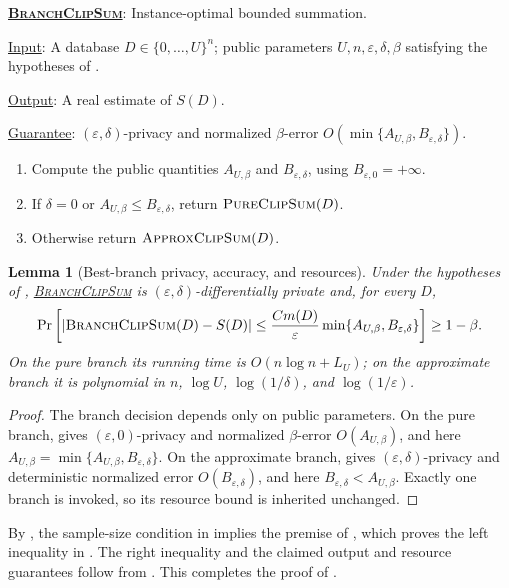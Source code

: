 \documentclass[11pt]{article}
\newenvironment{fminipage}%
  {\begin{Sbox}\begin{minipage}}%
  {\end{minipage}\end{Sbox}\fbox{\TheSbox}}
\newenvironment{algbox}[0]{%
\vskip 0.2in
\noindent
\begin{fminipage}{6.3in}
}{%
\end{fminipage}
\vskip 0.2in
}
\newtheorem{lemma}{Lemma}[section]
\begin{document}
\begin{algbox}
\textbf{\uline{\textsc{BranchClipSum}}}: Instance-optimal bounded
summation.  \label{alg:branch-clip-sum}

\uline{Input}: A database $D\in\{0,\ldots,U\}^n$; public parameters
$U,n,\varepsilon,\delta,\beta$ satisfying the hypotheses of
.

\uline{Output}: A real estimate of $S(D)$.

\uline{Guarantee}: $(\varepsilon,\delta)$-privacy and normalized
$\beta$-error $O(\min\{A_{U,\beta},B_{\varepsilon,\delta}\})$.

\begin{enumerate}[leftmargin=*,nosep]
  \item Compute the public quantities $A_{U,\beta}$ and
  $B_{\varepsilon,\delta}$, using $B_{\varepsilon,0}=+\infty$.
  \item If $\delta=0$ or $A_{U,\beta}\le B_{\varepsilon,\delta}$, return
  $\text{\textsc{PureClipSum}}(D)$.
  \item Otherwise return $\text{\textsc{ApproxClipSum}}(D)$.
\end{enumerate}
\end{algbox}

\begin{lemma}[Best-branch privacy, accuracy, and resources]
\label{lem:branch-wrapper}
Under the hypotheses of ,
\hyperref[alg:branch-clip-sum]{\textsc{BranchClipSum}} is
$(\varepsilon,\delta)$-differentially private and, for every $D$,
\[
 \Pr\left[
  |\text{\textsc{BranchClipSum}}(D)-S(D)|
  \le\frac{C m(D)}\varepsilon
       \min\{A_{U,\beta},B_{\varepsilon,\delta}\}
 \right]\ge1-\beta.
\]
On the pure branch its running time is $O(n\log n+L_U)$; on the approximate
branch it is polynomial in $n$, $\log U$, $\log(1/\delta)$, and
$\log(1/\varepsilon)$.
\end{lemma}

\begin{proof}
The branch decision depends only on public parameters.  On the pure branch,
 gives $(\varepsilon,0)$-privacy and normalized
$\beta$-error $O(A_{U,\beta})$, and here
$A_{U,\beta}=\min\{A_{U,\beta},B_{\varepsilon,\delta}\}$.  On the
approximate branch,  gives
$(\varepsilon,\delta)$-privacy and deterministic normalized error
$O(B_{\varepsilon,\delta})$, and here
$B_{\varepsilon,\delta}<A_{U,\beta}$.  Exactly one branch is invoked, so its
resource bound is inherited unchanged.
\end{proof}

By , the sample-size condition in
 implies the premise of , which proves
the left inequality in .  The right inequality and the
claimed output and resource guarantees follow from
.  This completes the proof of .



\end{document}
